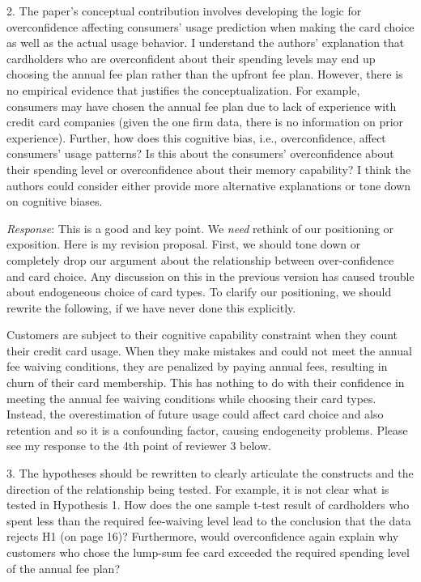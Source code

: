 \documentclass[titlepage,12pt,letterpaper]{article}
\numberwithin{equation}{section}
\begin{document}
2. 	The paper's conceptual contribution involves developing the logic for overconfidence affecting consumers' usage prediction when making the card choice as well as the actual usage behavior. I understand the authors' explanation that cardholders who are overconfident about their spending levels may end up choosing the annual fee plan rather than the upfront fee plan. However, there is no empirical evidence that justifies the conceptualization. For example, consumers may have chosen the annual fee plan due to lack of experience with credit card companies (given the one firm data, there is no information on prior experience). Further, how does this cognitive bias, i.e., overconfidence, affect consumers' usage patterns? Is this about the consumers' overconfidence about their spending level or overconfidence about their memory capability? I think the authors could consider either provide more alternative explanations or tone down on cognitive biases.

\emph{Response}: This is a good and key point. We \emph{need} rethink of our positioning or exposition. Here is my revision proposal. First, we should tone down or completely drop our argument about the relationship between over-confidence and card choice. Any discussion on this in the previous version has caused trouble about endogeneous choice of card types. To clarify our positioning, we should rewrite the following, if we have never done this explicitly. 

Customers are subject to their cognitive capability constraint when they count their credit card usage. When they make mistakes and could not meet the annual fee waiving conditions, they are penalized by paying annual fees, resulting in churn of their card membership. This has nothing to do with their confidence in meeting the annual fee waiving conditions while choosing their card types. Instead, the overestimation of future usage could affect card choice and also retention and so it is a confounding factor, causing endogeneity problems. Please see my response to the 4th point of reviewer 3 below.  

3. 	The hypotheses should be rewritten to clearly articulate the constructs and the direction of the relationship being tested. For example, it is not clear what is tested in Hypothesis 1. How does the one sample t-test result of cardholders who spent less than the required fee-waiving level lead to the conclusion that the data rejects H1 (on page 16)? Furthermore, would overconfidence again explain why customers who chose the lump-sum fee card exceeded the required spending level of the annual fee plan?
\end{document}

